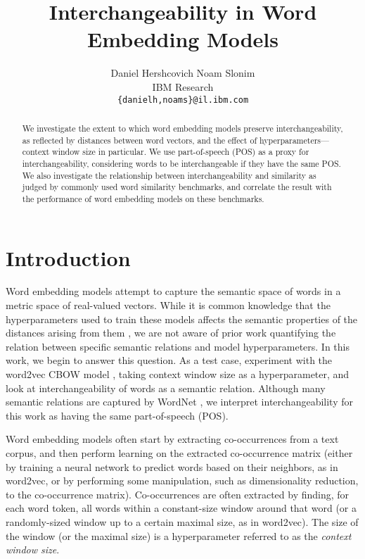 \documentclass{article}
\title{Interchangeability in Word Embedding Models}
\author{
Daniel Hershcovich \qquad Noam Slonim \\
IBM Research\\
\texttt{\{danielh,noams\}@il.ibm.com}
}
\begin{document}
    \maketitle

    \begin{abstract}
    We investigate the extent to which word embedding models
    preserve interchangeability, as reflected by distances between
    word vectors, and the effect of hyperparameters---context window size in particular.
    We use part-of-speech (POS) as a proxy for interchangeability,
    considering words to be interchangeable if they have the same POS.
    We also investigate the relationship between interchangeability
    and similarity as judged by commonly used word similarity benchmarks,
    and correlate the result with the performance of word embedding models
    on these benchmarks.
    \end{abstract}

    \section{Introduction}\label{sec:introduction}

    Word embedding models attempt to capture the semantic space of words
    in a metric space of real-valued vectors.
    While it is common knowledge that the hyperparameters used to train these
    models affects the semantic properties of the distances arising from them
    \cite{goldberg2016primer}, we are not aware of prior work quantifying the
    relation between specific semantic relations and model hyperparameters.
    In this work, we begin to answer this question.
    As a test case, experiment with the word2vec CBOW model
    \cite{mikolov2013efficient}, taking context window size as a hyperparameter,
    and look at interchangeability of words as a semantic relation.
    Although many semantic relations are captured by WordNet
    \cite{yang2006verb,agirre2009study},
    we interpret interchangeability for this work as having the same part-of-speech
    (POS).
    
    Word embedding models often start by extracting co-occurrences from a text
    corpus, and then perform learning on the extracted co-occurrence matrix
    (either by training a neural network to predict words based on their neighbors,
    as in word2vec, or by performing some manipulation,
    such as dimensionality reduction, to the co-occurrence matrix).
    Co-occurrences are often extracted by finding, for each word token, all
    words within a constant-size window around that word (or a randomly-sized
    window up to a certain maximal size, as in word2vec).
    The size of the window (or the maximal size)
    is a hyperparameter referred to as the \textit{context window size}.
\end{document}
